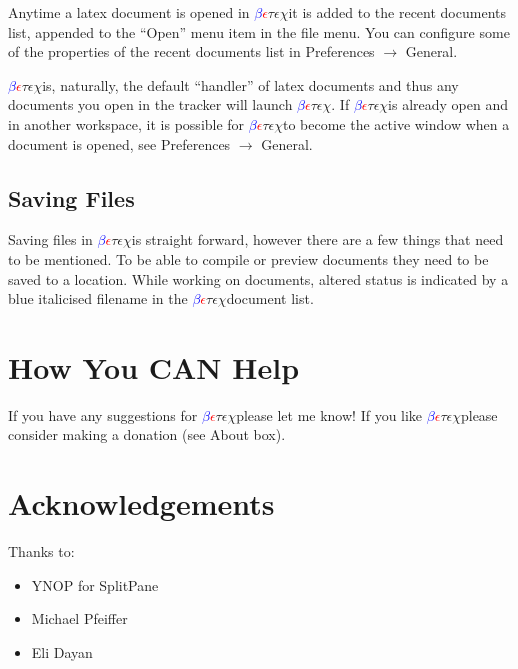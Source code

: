 \documentclass[a4paper,12pt]{article}
\newcommand{\betex}{\textcolor{blue}{$\beta$}\textcolor{red}{$\epsilon$}$\tau\epsilon\chi$\hspace{1mm}}
\begin{document}
Anytime a latex document is opened in \betex it is added to the recent documents list, appended to the ``Open'' menu item in the file menu. You can configure some of the properties of the recent documents list in Preferences $\to$ General.

\betex is, naturally, the default ``handler'' of latex documents and thus any documents you open in the tracker will launch \betex. If \betex is already open and in another workspace, it is possible for \betex to become the active window when a document is opened, see Preferences $\to$ General.
\subsection{Saving Files}
Saving files in \betex is straight forward, however there are a few things that need to be mentioned. To be able to compile or preview documents they need to be saved to a location. While working on documents, altered status is indicated by a blue italicised filename in the \betex document list.

\section{How You CAN Help}
If you have any suggestions for \betex please let me know!
If you like \betex please consider making a donation (see About box).

\section{Acknowledgements}
Thanks to:
\begin{itemize}
\item{YNOP for SplitPane}
\item{Michael Pfeiffer}
\item{Eli Dayan}
\end{itemize}
\end{document}
